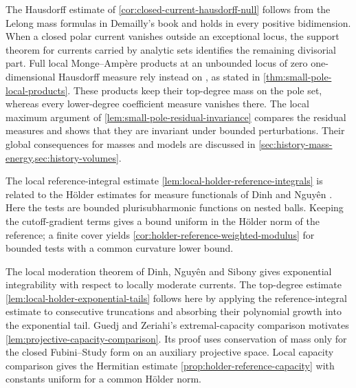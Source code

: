 The Hausdorff estimate of \cref{cor:closed-current-hausdorff-null} follows from the Lelong mass formulas in Demailly's book \cite[Chapter III, formulas (5.5)--(5.8), pp.~158--159]{DemCADG} and holds in every positive bidimension. When a closed polar current vanishes outside an exceptional locus, the support theorem for currents carried by analytic sets \cite[Chapter III, Corollaries~2.11 and 2.14, pp.~141--143]{DemCADG} identifies the remaining divisorial part. Full local Monge--Amp\`ere products at an unbounded locus of zero one-dimensional Hausdorff measure rely instead on \cite[Chapter III, Theorem~4.5 and Proposition~4.9, pp.~152--156]{DemCADG}, as stated in \cref{thm:small-pole-local-products}. These products keep their top-degree mass on the pole set, whereas every lower-degree coefficient measure vanishes there. The local maximum argument of \cref{lem:small-pole-residual-invariance} compares the residual measures and shows that they are invariant under bounded perturbations. Their global consequences for masses and models are discussed in \cref{sec:history-mass-energy,sec:history-volumes}.

The local reference-integral estimate \cref{lem:local-holder-reference-integrals} is related to the H\"older estimates for measure functionals of Dinh and Nguy{\^e}n \cite[arXiv v1, Lemma~3.5 and Proposition~3.6, pp.~9--10]{DNHolder14}. Here the tests are bounded plurisubharmonic functions on nested balls. Keeping the cutoff-gradient terms gives a bound uniform in the H\"older norm of the reference; a finite cover yields \cref{cor:holder-reference-weighted-modulus} for bounded tests with a common curvature lower bound.

The local moderation theorem of Dinh, Nguy{\^e}n and Sibony \cite[Theorem~1.1 and Corollary~1.2, pp.~466--467; proof pp.~468--471]{DNSModerate10} gives exponential integrability with respect to locally moderate currents. The top-degree estimate \cref{lem:local-holder-exponential-tails} follows here by applying the reference-integral estimate to consecutive truncations and absorbing their polynomial growth into the exponential tail. Guedj and Zeriahi's extremal-capacity comparison \cite[Theorem~5.2, pp.~622--623, and Proposition~7.1, p.~632]{GZIntrinsic05} motivates \cref{lem:projective-capacity-comparison}. Its proof uses conservation of mass only for the closed Fubini--Study form on an auxiliary projective space. Local capacity comparison gives the Hermitian estimate \cref{prop:holder-reference-capacity} with constants uniform for a common H\"older norm.

